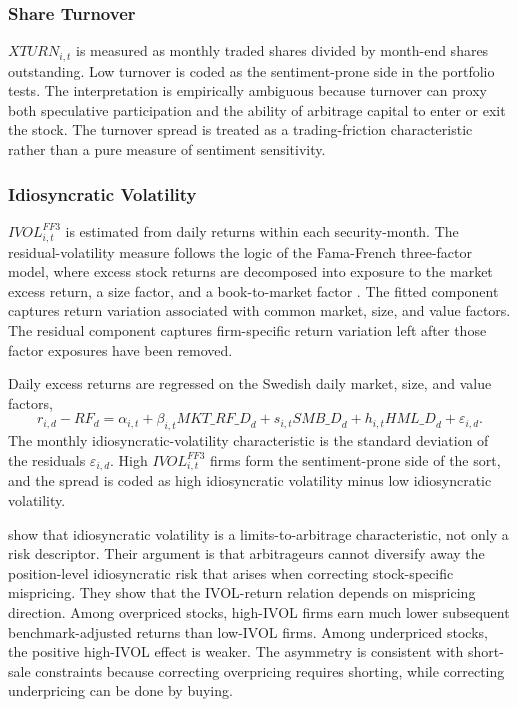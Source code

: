 \documentclass[11pt]{article}
\newcommand{\var}[1]{\ensuremath{#1}}
\begin{document}
\subsubsection{Share Turnover}
\var{XTURN_{i,t}} is measured as monthly traded shares divided by month-end shares outstanding. Low turnover is coded as the sentiment-prone side in the portfolio tests. The interpretation is empirically ambiguous because turnover can proxy both speculative participation and the ability of arbitrage capital to enter or exit the stock. The turnover spread is treated as a trading-friction characteristic rather than a pure measure of sentiment sensitivity.

\subsubsection{Idiosyncratic Volatility}
\var{IVOL^{FF3}_{i,t}} is estimated from daily returns within each security-month. The residual-volatility measure follows the logic of the Fama-French three-factor model, where excess stock returns are decomposed into exposure to the market excess return, a size factor, and a book-to-market factor \citep{fama1993common}. The fitted component captures return variation associated with common market, size, and value factors. The residual component captures firm-specific return variation left after those factor exposures have been removed.

Daily excess returns are regressed on the Swedish daily market, size, and value factors,
\begin{equation}
    r_{i,d} - RF_d
    =
    \alpha_{i,t}
    + \beta_{i,t} \var{MKT\_RF\_D}_d
    + s_{i,t} \var{SMB\_D}_d
    + h_{i,t} \var{HML\_D}_d
    + \varepsilon_{i,d}.
\end{equation}
The monthly idiosyncratic-volatility characteristic is the standard deviation of the residuals \var{\varepsilon_{i,d}}. High \var{IVOL^{FF3}_{i,t}} firms form the sentiment-prone side of the sort, and the spread is coded as high idiosyncratic volatility minus low idiosyncratic volatility.

\citet{stambaugh2015ivol} show that idiosyncratic volatility is a limits-to-arbitrage characteristic, not only a risk descriptor. Their argument is that arbitrageurs cannot diversify away the position-level idiosyncratic risk that arises when correcting stock-specific mispricing. They show that the IVOL-return relation depends on mispricing direction. Among overpriced stocks, high-IVOL firms earn much lower subsequent benchmark-adjusted returns than low-IVOL firms. Among underpriced stocks, the positive high-IVOL effect is weaker. The asymmetry is consistent with short-sale constraints because correcting overpricing requires shorting, while correcting underpricing can be done by buying.
\end{document}
